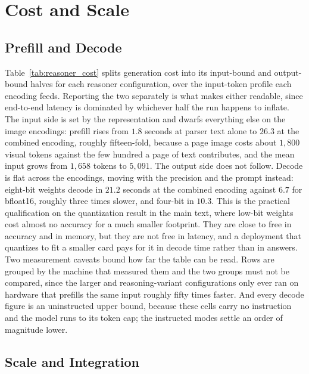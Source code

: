 \newpage




\section{Cost and Scale}
\label{app:add_cost}

\subsection{Prefill and Decode}
\label{app:generation_cost}

Table~\ref{tab:reasoner_cost} splits generation cost into its input-bound and output-bound halves for each reasoner configuration, over the input-token profile each encoding feeds. Reporting the two separately is what makes either readable, since end-to-end latency is dominated by whichever half the run happens to inflate. The input side is set by the representation and dwarfs everything else on the image encodings: prefill rises from $1.8$ seconds at parser text alone to $26.3$ at the combined encoding, roughly fifteen-fold, because a page image costs about $1{,}800$ visual tokens against the few hundred a page of text contributes, and the mean input grows from $1{,}658$ tokens to $5{,}091$. The output side does not follow. Decode is flat across the encodings, moving with the precision and the prompt instead: eight-bit weights decode in $21.2$ seconds at the combined encoding against $6.7$ for bfloat16, roughly three times slower, and four-bit in $10.3$. This is the practical qualification on the quantization result in the main text, where low-bit weights cost almost no accuracy for a much smaller footprint. They are close to free in accuracy and in memory, but they are not free in latency, and a deployment that quantizes to fit a smaller card pays for it in decode time rather than in answers. Two measurement caveats bound how far the table can be read. Rows are grouped by the machine that measured them and the two groups must not be compared, since the larger and reasoning-variant configurations only ever ran on hardware that prefills the same input roughly fifty times faster. And every decode figure is an uninstructed upper bound, because these cells carry no instruction and the model runs to its token cap; the instructed modes settle an order of magnitude lower.

\subsection{Scale and Integration}
\label{app:scale_integration}

